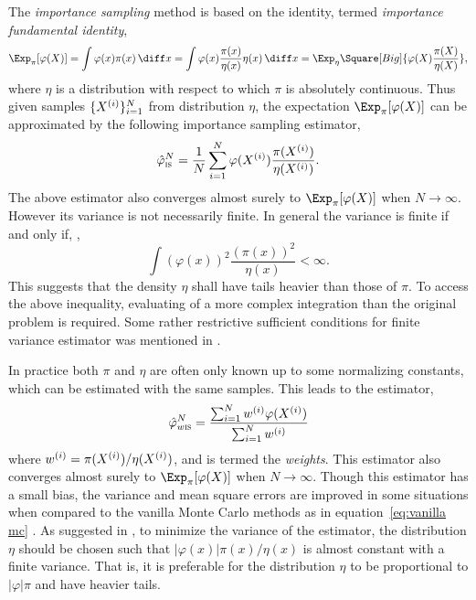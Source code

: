 The \emph{importance sampling} method is based on the identity, termed
\emph{importance fundamental identity},
\begin{equation}
  \Exp_{\pi}[\varphi(X)]
  = \int\varphi(x)\pi(x)\intd x
  = \int\varphi(x)\frac{\pi(x)}{\eta(x)}\eta(x)\intd x
  = \Exp_{\eta}\Square[Big]{\varphi(X)\frac{\pi(X)}{\eta(X)}},
\end{equation}
where $\eta$ is a distribution with respect to which $\pi$ is absolutely
continuous. Thus given \iid samples $\{X^{(i)}\}_{i=1}^N$ from distribution
$\eta$, the expectation $\Exp_{\pi}[\varphi(X)]$ can be approximated by the
following importance sampling estimator,
\begin{equation}
  \hat\varphi_{\text{\textsc{is}}}^N
  = \frac{1}{N}\sum_{i=1}^N\varphi(X^{(i)})\frac{\pi(X^{(i)})}{\eta(X^{(i)})}.
\end{equation}
The above estimator also converges almost surely to $\Exp_{\pi}[\varphi(X)]$
when $N\to\infty$. However its variance is not necessarily finite. In general
the variance is finite if and only if,
\parencite[see][sec.~3.3]{Robert:2004tn},
\begin{equation}
  \int(\varphi(x))^2\frac{(\pi(x))^2}{\eta(x)} < \infty.
\end{equation}
This suggests that the density $\eta$ shall have tails heavier than those of
$\pi$. To access the above inequality, evaluating of a more complex
integration than the original problem is required. Some rather restrictive
sufficient conditions for finite variance estimator was mentioned in
\textcite{Geweke:1989tm}.

In practice both $\pi$ and $\eta$ are often only known up to some normalizing
constants, which can be estimated with the same samples. This leads to the
estimator,
\begin{equation}
  \hat\varphi_{w\text{\textsc{is}}}^N
  = \frac{\sum_{i=1}^Nw^{(i)}\varphi(X^{(i)})}{\sum_{i=1}^Nw^{(i)}}
\end{equation}
where $w^{(i)} = \pi(X^{(i)})/\eta(X^{(i)})$, and is termed the \emph{weights}.  This
estimator also converges almost surely to $\Exp_{\pi}[\varphi(X)]$ when
$N\to\infty$. Though this estimator has a small bias, the variance and mean
square errors are improved in some situations when compared to the vanilla
Monte Carlo methods as in equation~\eqref{eq:vanilla mc}
\parencite{Casella:1998tj}. As suggested in
\textcite[][sec.~3.3]{Robert:2004tn}, to minimize the variance of the
estimator, the distribution $\eta$ should be chosen such that
$|\varphi(x)|\pi(x)/\eta(x)$ is almost constant with a finite variance. That
is, it is preferable for the distribution $\eta$ to be proportional to
$|\varphi|\pi$ and have heavier tails.

